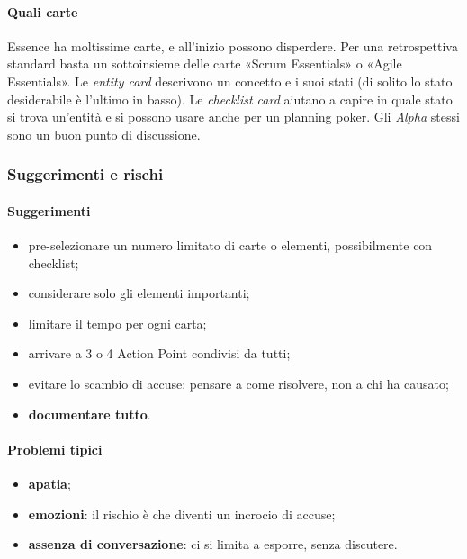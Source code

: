 \documentclass[a4paper,12pt]{article}
\begin{document}
\paragraph{Quali carte}
Essence ha moltissime carte, e all'inizio possono disperdere. Per una retrospettiva
standard basta un sottoinsieme delle carte «Scrum Essentials» o «Agile Essentials».
Le \emph{entity card} descrivono un concetto e i suoi stati (di solito lo stato
desiderabile è l'ultimo in basso). Le \emph{checklist card} aiutano a capire in quale stato
si trova un'entità e si possono usare anche per un planning poker. Gli \emph{Alpha} stessi
sono un buon punto di discussione.

\subsubsection{Suggerimenti e rischi}
\paragraph{Suggerimenti}
\begin{itemize}[nosep]
  \item pre-selezionare un numero limitato di carte o elementi, possibilmente con checklist;
  \item considerare solo gli elementi importanti;
  \item limitare il tempo per ogni carta;
  \item arrivare a 3 o 4 Action Point condivisi da tutti;
  \item evitare lo scambio di accuse: pensare a come risolvere, non a chi ha causato;
  \item \textbf{documentare tutto}.
\end{itemize}

\paragraph{Problemi tipici}
\begin{itemize}[nosep]
  \item \textbf{apatia};
  \item \textbf{emozioni}: il rischio è che diventi un incrocio di accuse;
  \item \textbf{assenza di conversazione}: ci si limita a esporre, senza discutere.
\end{itemize}
\end{document}
